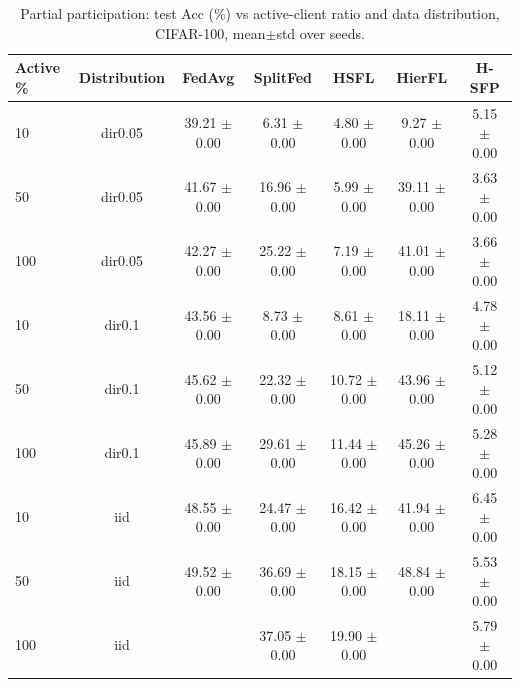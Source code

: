 \begin{table}[t]
\centering
\caption{Partial participation: test Acc (\%) vs active-client ratio and data distribution, CIFAR-100, mean$\pm$std over seeds.}
\label{tab:partial}
\begin{tabular}{lcccccc}
\toprule
Active \% & Distribution & FedAvg & SplitFed & HSFL & HierFL & H-SFP \\
\midrule
10 & dir0.05 & 39.21 $\pm$ 0.00 & 6.31 $\pm$ 0.00 & 4.80 $\pm$ 0.00 & 9.27 $\pm$ 0.00 & 5.15 $\pm$ 0.00 \\
50 & dir0.05 & 41.67 $\pm$ 0.00 & 16.96 $\pm$ 0.00 & 5.99 $\pm$ 0.00 & 39.11 $\pm$ 0.00 & 3.63 $\pm$ 0.00 \\
100 & dir0.05 & 42.27 $\pm$ 0.00 & 25.22 $\pm$ 0.00 & 7.19 $\pm$ 0.00 & 41.01 $\pm$ 0.00 & 3.66 $\pm$ 0.00 \\
10 & dir0.1 & 43.56 $\pm$ 0.00 & 8.73 $\pm$ 0.00 & 8.61 $\pm$ 0.00 & 18.11 $\pm$ 0.00 & 4.78 $\pm$ 0.00 \\
50 & dir0.1 & 45.62 $\pm$ 0.00 & 22.32 $\pm$ 0.00 & 10.72 $\pm$ 0.00 & 43.96 $\pm$ 0.00 & 5.12 $\pm$ 0.00 \\
100 & dir0.1 & 45.89 $\pm$ 0.00 & 29.61 $\pm$ 0.00 & 11.44 $\pm$ 0.00 & 45.26 $\pm$ 0.00 & 5.28 $\pm$ 0.00 \\
10 & iid & 48.55 $\pm$ 0.00 & 24.47 $\pm$ 0.00 & 16.42 $\pm$ 0.00 & 41.94 $\pm$ 0.00 & 6.45 $\pm$ 0.00 \\
50 & iid & 49.52 $\pm$ 0.00 & 36.69 $\pm$ 0.00 & 18.15 $\pm$ 0.00 & 48.84 $\pm$ 0.00 & 5.53 $\pm$ 0.00 \\
100 & iid &  & 37.05 $\pm$ 0.00 & 19.90 $\pm$ 0.00 &  & 5.79 $\pm$ 0.00 \\
\bottomrule
\end{tabular}
\end{table}
